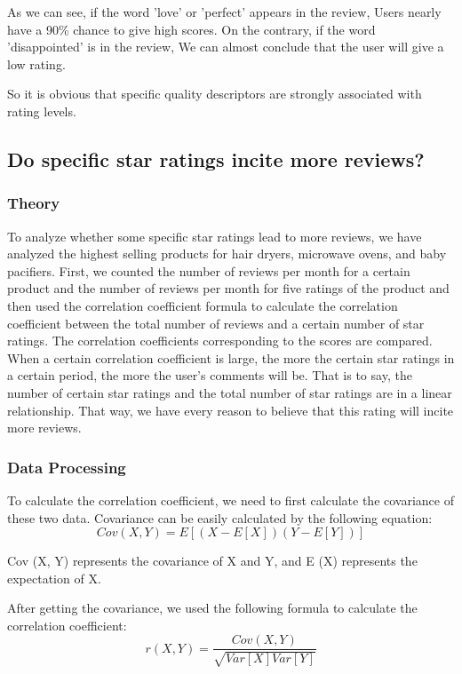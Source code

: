 \documentclass{mcmthesis}
\begin{document}
	As we can see, if the word 'love' or 'perfect' appears in the review, Users nearly have a 90\% chance to give high scores. On the contrary, if the word 'disappointed' is in the review, We can almost conclude that the user will give a low rating.
	
	So it is obvious that specific quality descriptors are strongly associated with rating levels.
	
	\subsection{Do specific star ratings incite more reviews? }
	\subsubsection{Theory}
	
	To analyze whether some specific star ratings lead to more reviews, we have analyzed the highest selling products for hair dryers, microwave ovens, and baby pacifiers. First, we counted the number of reviews per month for a certain product and the number of reviews per month for five ratings of the product and then used the correlation coefficient formula to calculate the correlation coefficient between the total number of reviews and a certain number of star ratings. The correlation coefficients corresponding to the scores are compared. When a certain correlation coefficient is large, the more the certain star ratings in a certain period, the more the user's comments will be. That is to say, the number of certain star ratings and the total number of star ratings are in a linear relationship. That way, we have every reason to believe that this rating will incite more reviews.
	
	\subsubsection{Data Processing}
	
	To calculate the correlation coefficient, we need to first calculate the covariance of these two data. Covariance can be easily calculated by the following equation:
	$$Cov(X,Y)=E[(X-E[X])(Y-E[Y])]$$
	
	Cov (X, Y) represents the covariance of X and Y, and E (X) represents the expectation of X.
	
	After getting the covariance, we used the following formula to calculate the correlation coefficient:
	$$r(X,Y)=\frac{Cov(X,Y)}{\sqrt{Var[X]Var[Y]}}$$
	
\end{document}
